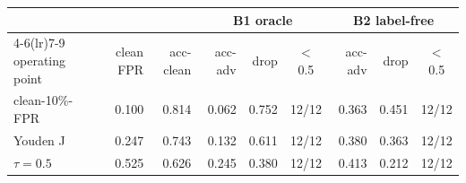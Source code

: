 \footnotesize
\setlength{\tabcolsep}{5pt}
\begin{tabular}{@{}lrr rrc rrc@{}}
\toprule
 &  &  & \multicolumn{3}{c}{B1 oracle} & \multicolumn{3}{c}{B2 label-free} \\
\cmidrule(lr){4-6}\cmidrule(lr){7-9}
operating point & clean FPR & acc-clean & acc-adv & drop & $<$0.5 & acc-adv & drop & $<$0.5 \\
\midrule
clean-10\%-FPR & 0.100 & 0.814 & 0.062 & 0.752 & 12/12 & 0.363 & 0.451 & 12/12 \\
Youden J & 0.247 & 0.743 & 0.132 & 0.611 & 12/12 & 0.380 & 0.363 & 12/12 \\
$\tau{=}0.5$ & 0.525 & 0.626 & 0.245 & 0.380 & 12/12 & 0.413 & 0.212 & 12/12 \\
\bottomrule
\end{tabular}
